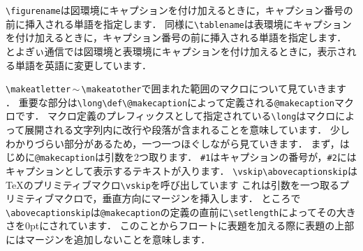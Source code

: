 \verb|\figurename|は図環境にキャプションを付け加えるときに，キャプション番号の前に挿入される単語を指定します．
同様に\verb|\tablename|は表環境にキャプションを付け加えるときに，キャプション番号の前に挿入される単語を指定します．
とよぎぃ通信では図環境と表環境にキャプションを付け加えるときに，表示される単語を英語に変更しています．

\verb|\makeatletter|\,$\sim$\,\verb|\makeatother|で囲まれた範囲のマクロについて見ていきます
．
重要な部分は\verb|\long\def\@makecaption|によって定義される\verb|@makecaption|マクロです．
マクロ定義のプレフィックスとして指定されている\verb|\long|はマクロによって展開される文字列内に改行や段落が含まれることを意味しています．
少しわかりづらい部分があるため，一つ一つほぐしながら見ていきます．
まず，はじめに\verb|@makecaption|は引数を2つ取ります．
\verb|#1|はキャプションの番号が，\verb|#2|にはキャプションとして表示するテキストが入ります．
\verb|\vskip\abovecaptionskip|は{\TeX}のプリミティブマクロ\verb|\vskip|を呼び出しています
これは引数を一つ取るプリミティブマクロで，垂直方向にマージンを挿入します．
ところで\verb|\abovecaptionskip|は\verb|@makecaption|の定義の直前に\verb|\setlength|によってその大きさを0ptにされています．
このことからフロートに表題を加える際に表題の上部にはマージンを追加しないことを意味します．

